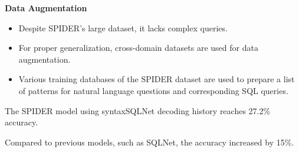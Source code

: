 \textbf{Data Augmentation}

\begin{itemize}
    \item Despite SPIDER's large dataset, it lacks complex queries.
    \item For proper generalization, cross-domain datasets are used for data augmentation.
    \item Various training databases of the SPIDER dataset are used to prepare a list of patterns for natural language questions and corresponding SQL queries.
\end{itemize}

The SPIDER model using syntaxSQLNet decoding history reaches 27.2\% accuracy.


Compared to previous models, such as SQLNet, the accuracy increased by 15\%.